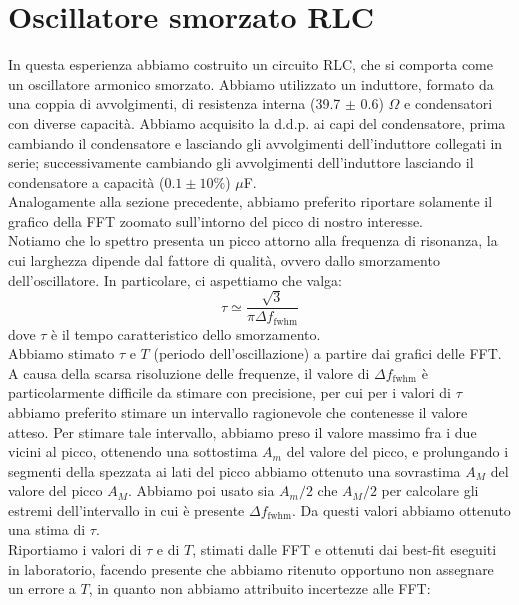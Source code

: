 \documentclass{article}[a4paper, oneside,11pt]
\begin{document}
\section{Oscillatore smorzato RLC}
In questa esperienza abbiamo costruito un circuito RLC, che si comporta come un oscillatore armonico smorzato. Abbiamo utilizzato un induttore, formato da una coppia di avvolgimenti, di resistenza interna (39.7 $\pm$ 0.6) $\Omega$ e condensatori con diverse capacità. Abbiamo acquisito la d.d.p. ai capi del condensatore, prima cambiando il condensatore e lasciando gli avvolgimenti dell'induttore collegati in serie; successivamente cambiando gli avvolgimenti dell'induttore lasciando il condensatore a capacità ($0.1 \pm 10\%$) $\mu$F.\\
Analogamente alla sezione precedente, abbiamo preferito riportare solamente il grafico della FFT zoomato sull'intorno del picco di nostro interesse.\\
Notiamo che lo spettro presenta un picco attorno alla frequenza di risonanza, la cui larghezza dipende dal fattore di qualità, ovvero dallo smorzamento dell'oscillatore. In particolare, ci aspettiamo che valga:
\[\tau \simeq \frac{\sqrt{3}}{\pi \Delta f_{\text{fwhm}}} \]
dove $\tau$ è il tempo caratteristico dello smorzamento.\\
Abbiamo stimato $\tau$ e $T$ (periodo dell'oscillazione) a partire dai grafici delle FFT. A causa della scarsa risoluzione delle frequenze, il valore di $\Delta f_{\text{fwhm}}$ è particolarmente difficile da stimare con precisione, per cui per i valori di $\tau$ abbiamo preferito stimare un intervallo ragionevole che contenesse il valore atteso. Per stimare tale intervallo, abbiamo preso il valore massimo fra i due vicini al picco, ottenendo una sottostima $A_m$ del valore del picco, e prolungando i segmenti della spezzata ai lati del picco abbiamo ottenuto una sovrastima $A_M$ del valore del picco $A_M$. Abbiamo poi usato sia $A_m/2$ che $A_M/2$ per calcolare gli estremi dell'intervallo in cui è presente $\Delta f_{\text{fwhm}}$. Da questi valori abbiamo ottenuto una stima di $\tau$. \\
Riportiamo i valori di $\tau$ e di $T$, stimati dalle FFT e ottenuti dai best-fit eseguiti in laboratorio, facendo presente che abbiamo ritenuto opportuno non assegnare un errore a $T$, in quanto non abbiamo attribuito incertezze alle FFT:\\
\end{document}
